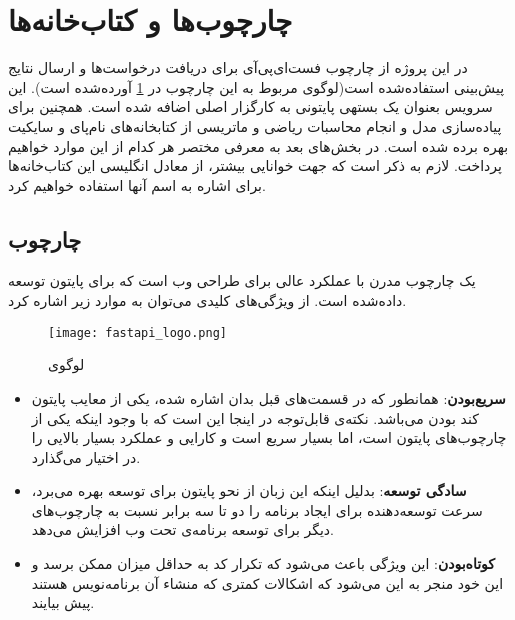\section{چارچوب‌ها و کتاب‌خانه‌ها}
در این پروژه از چارچوب فست‌ای‌پی‌آی برای دریافت درخواست‌ها و ارسال نتایج پیش‌بینی استفاده‌شده است(لوگوی مربوط به این چارچوب در \cref{fig:fastapi_logo}\cite{tiangoloFastAPI} آورده‌شده است). این سرویس بعنوان یک بستهی پایتونی به کارگزار اصلی اضافه شده است. همچنین برای پیاده‌سازی مدل و انجام محاسبات ریاضی و ماتریسی از کتابخانه‌های نام‌پای و سایکیت بهره برده شده است. در بخش‌های بعد به معرفی مختصر هر کدام از این موارد خواهیم پرداخت. لازم به ذکر است که جهت خوانایی بیشتر، از معادل انگلیسی این کتاب‌خانه‌ها برای اشاره به اسم آنها استفاده خواهیم کرد.

\subsection{چارچوب }
یک چارچوب مدرن با عملکرد عالی برای طراحی وب است که برای پایتون توسعه داده‌شده است. از ویژگی‌های کلیدی  می‌توان به موارد زیر اشاره کرد\cite{tiangoloFastAPI}.

\begin{figure}[!h]
\centerline{\texttt{[image: fastapi\_logo.png]}}
\caption{لوگوی \cite{tiangoloFastAPI}}
\label{fig:fastapi_logo}
\end{figure}
\begin{itemize}

\item \textbf{سریع‌بودن}: همانطور که در قسمت‌های قبل بدان اشاره شده، یکی از معایب پایتون کند بودن می‌باشد. نکته‌ی قابل‌توجه در اینجا این است که با وجود اینکه یکی از چارچوب‌های پایتون است، اما  بسیار سریع است و کارایی و عملکرد بسیار بالایی را در اختیار می‌گذارد.

\item \textbf{سادگی توسعه}: بدلیل اینکه این زبان از نحو پایتون برای توسعه بهره می‌برد، سرعت توسعه‌دهنده برای ایجاد برنامه را دو تا سه برابر نسبت به چارچوب‌های دیگر برای توسعه برنامه‌ی تحت وب افزایش می‌دهد.

\item \textbf{کوتاه‌بودن}: این ویژگی باعث می‌شود که تکرار کد به حداقل میزان ممکن برسد و این خود منجر به این می‌شود که اشکالات کمتری که منشاء آن برنامه‌نویس هستند پیش بیایند.

\end{itemize}

